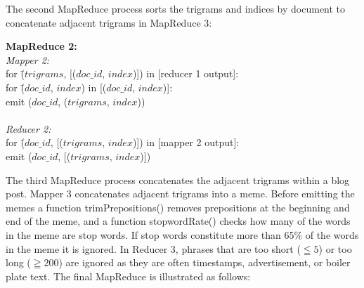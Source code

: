 \documentclass{sig-alternate}
\begin{document}
The second MapReduce process sorts the trigrams and indices by document to concatenate adjacent trigrams in MapReduce 3:

\begin{centering}
\begin{tabbing}
\textbf{MapReduce 2:}\\
\emph{Mapper 2:}\\
for \= ($trigrams$, [($doc\_id$, $index$)]) in [reducer 1 output]:\\
\>	for \= ($doc\_id$, $index$) in [($doc\_id$, $index$)]:\\
\>\> emit ($doc\_id$, ($trigrams$, $index$))\\
\\
\emph{Reducer 2:}\\
for \= ($doc\_id$, [($trigrams$, $index$)]) in [mapper 2 output]:\\
\>	emit ($doc\_id$, [($trigrams$, $index$)])

\end{tabbing}

\end{centering}

The third MapReduce process concatenates the adjacent trigrams within a blog post. Mapper 3 concatenates adjacent trigrams into a meme. Before emitting the memes a function trimPrepositions() removes prepositions at the beginning and end of the meme, and a function stopwordRate() checks how many of the words in the meme are stop words. If stop words constitute more than 65\% of the words in the meme it is ignored. In Reducer 3, phrases that are too short ($\leqq 5$) or too long ($\geqq 200$) are ignored as they are often timestamps, advertisement, or boiler plate text. The final MapReduce is illustrated as follows:
\end{document}
